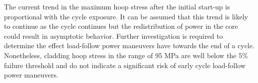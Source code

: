 \documentclass[edeposit,fullpage,11pt]{uiucthesis2009}
\begin{document}
The current trend in the maximum hoop stress after the initial start-up is proportional with the cycle exposure.
It can be assumed that this trend is likely to continue as the cycle continues but the redistribution of power in the core could result in asymptotic behavior.
Further investigation is required to determine the effect load-follow power maneuvers have towards the end of a cycle.
Nonetheless, cladding hoop stress in the range of 95 MPa are well below the 5\% failure threshold and do not indicate a significant risk of early cycle load-follow power maneuvers. 

\begin{table}
\caption{Maximum clad hoop stress for each load-follow power maneuver}
\label{tab:MHS}
\begin{center}
\end{center}
\end{table}
\end{document}
